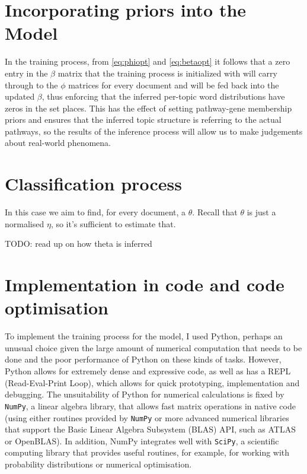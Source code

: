 \documentclass[12pt,a4paper,twoside,openright]{report}
\begin{document}


\section{Incorporating priors into the Model}

In the training process, from \eqref{eq:phiopt} and \eqref{eq:betaopt} it follows that a zero entry in the $\beta$ matrix that the training process is initialized with will carry through to the $\phi$ matrices for every document and will be fed back into the updated $\beta$, thus enforcing that the inferred per-topic word distributions have zeros in the set places. This has the effect of setting pathway-gene membership priors and ensures that the inferred topic structure is referring to the actual pathways, so the results of the inference process will allow us to make judgements about real-world phenomena.

\section{Classification process}

In this case we aim to find, for every document, a $\theta$. Recall that $\theta$ is just a normalised $\eta$, so it's sufficient to estimate that.

TODO: read up on how theta is inferred

\section{Implementation in code and code optimisation}

To implement the training process for the model, I used Python, perhaps an unusual choice given the large amount of numerical computation that needs to be done and the poor performance of Python on these kinds of tasks. However, Python allows for extremely dense and expressive code, as well as has a REPL (Read-Eval-Print Loop), which allows for quick prototyping, implementation and debugging. The unsuitability of Python for numerical calculations is fixed by \texttt{NumPy}\cite{DBLP:journals/corr/abs-1102-1523}, a linear algebra library, that allows fast matrix operations in native code (using either routines provided by \texttt{NumPy} or more advanced numerical libraries that support the Basic Linear Algebra Subsystem (BLAS) API, such as ATLAS or OpenBLAS). In addition, NumPy integrates well with \texttt{SciPy}, a scientific computing library that provides useful routines, for example, for working with probability distributions or numerical optimisation.
\end{document}
